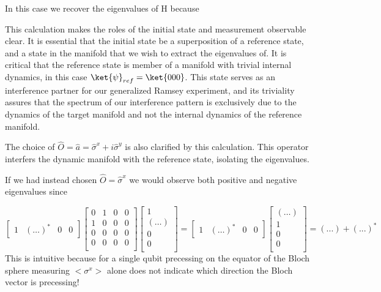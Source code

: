 In this case we recover the eigenvalues of H because 

This calculation makes the roles of the initial state and measurement observable clear.
It is essential that the initial state be a superposition of a reference state, and a state in the manifold that we wish to extract the eigenvalues of.
It is critical that the reference state is member of a manifold with trivial internal dynamics, in this case $\ket{\psi}_{ref} = \ket{000}$.
This state serves as an interference partner for our generalized Ramsey experiment,
and its triviality assures that the spectrum of our interference pattern is exclusively due to the dynamics of the target manifold and not the internal dynamics of the reference manifold.

The choice of $\hat{O} = \hat{a} = \hat{\sigma}^x + i \hat{\sigma}^y$ is also clarified by this calculation.
This operator interfers the dynamic manifold with the reference state, isolating the eigenvalues.

If we had instead chosen  $\hat{O} = \hat{\sigma}^x$ we would observe both positive and negative eigenvalues since

\begin{equation}
    \begin{bmatrix}
        1 & (\ldots)^* & 0 & 0
    \end{bmatrix}
    \begin{bmatrix}
        0 & 1 & 0 & 0 \\
        1 & 0 & 0 & 0 \\
        0 & 0 & 0 & 0 \\
        0 & 0 & 0 & 0 \\
    \end{bmatrix}
    \begin{bmatrix}
        1 \\
        (\ldots) \\
        0 \\
        0 \\
    \end{bmatrix}
    =
    \begin{bmatrix}
        1 & (\ldots)^* & 0 & 0
    \end{bmatrix}
    \begin{bmatrix}
        (\ldots) \\
        1 \\
        0 \\
        0 \\
    \end{bmatrix}
    = (...) + (...)^*
\end{equation}
This is intuitive because for a single qubit precessing on the equator of the Bloch sphere measuring $<\sigma^x>$ alone does not indicate which direction the Bloch vector is precessing!

